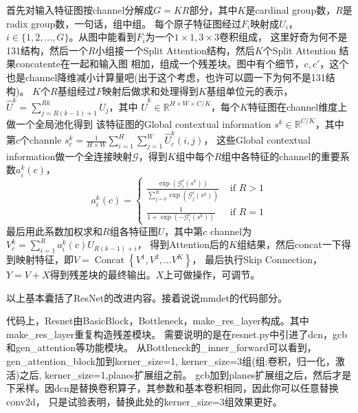 \documentclass[UTF8]{ctexart}
\begin{document}
首先对输入特征图按channel分解成$G=KR$部分，其中$K$是cardinal group数，$R$是radix group数，一句话，组中组。
每个原子特征图经过$F_i$映射成$U_i$， $i \in \{1, 2, ..., G\}$。从图中能看到$F_i$为一个$1\times 1, 3 \times 3$卷积组成，
这里好奇为何不是131结构，然后一个$R$小组接一个Split Attention结构，然后$K$个Split Attention 结果concatente在一起和输入图
相加，组成一个残差块。图中有个细节，$c, c'$，这个也是channel降维减小计算量吧(出于这个考虑，也许可以圆一下为何不是131结构)。
$K$个$R$基组经过$F$映射后做求和处理得到$K$基组单位元的表示，$\hat{U}^{k}=\sum_{j=R(k-1)+1}^{R k} U_{j}$，其中
$\hat{U}^{k} \in \mathbb{R}^{H \times W \times C / K}$，每个$K$特征图在channel维度上做一个全局池化得到
该特征图的Global contextual information $s^{k} \in \mathbb{R}^{C / K}$，其中第$c$个channle 
$s_{c}^{k}=\frac{1}{H \times W} \sum_{i=1}^{H} \sum_{j=1}^{W} \hat{U}_{c}^{k}(i, j)$，
这些Global contextual information做一个全连接映射$\mathcal{G}$，得到$K$组中每个$R$组中各特征的channel的重要系数$a_{i}^{k}(c)$，
$$
a_{i}^{k}(c)=\left\{\begin{array}{ll}
	\frac{\exp \left(\mathcal{G}_{i}^{c}\left(s^{k}\right)\right)}{\sum_{j=0}^{R} \exp 
	\left(\mathcal{G}_{j}^{c}\left(s^{k}\right)\right)} & \text { if } R>1 \\
	\frac{1}{1+\exp \left(-\mathcal{G}_{i}^{c}\left(s^{k}\right)\right)} & \text { if } R=1
\end{array}\right.
$$
最后用此系数加权求和$R$组各特征图$U$，其中第$c$ channel为
$V_{c}^{k}=\sum_{i=1}^{R} a_{i}^{k}(c) U_{R(k-1)+i}$，
得到Attention后的$K$组结果，然后concat一下得到映射特征，即$V=\operatorname{Concat}\left\{V^{1}, V^{2}, \ldots V^{K}\right\}$，
最后执行Skip Connection，$Y = V + X$得到残差块的最终输出。$X$上可做操作，可调节。

以上基本囊括了ResNet的改进内容。接着说说mmdet的代码部分。

代码上，Resnet由BasicBlock，Bottleneck，make\_res\_layer构成。其中make\_res\_layer重复构造残差模块。
需要说明的是在resnet.py中引进了dcn，gcb和gen\_attention等功能模块。
从Bottleneck的\_inner\_forward可以看到，gen\_attention\_block加到kerner\_size=1,
kerner\_size=3组(组:卷积，归一化，激活)之后,
kerner\_size=1,planes扩展组之前。
gcb加到planes扩展组之后，然后才是下采样。因dcn是替换卷积算子，其参数和基本卷积相同，因此你可以任意替换conv2d，
只是试验表明，替换此处的kerner\_size=3组效果更好。
\end{document}
